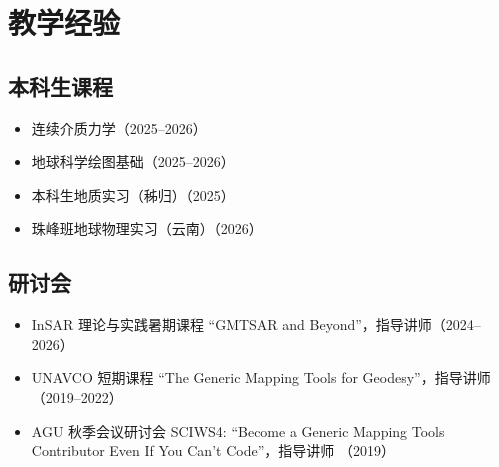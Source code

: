 \section{教学经验}

\subsection{本科生课程}
\begin{itemize}
\item 连续介质力学（2025--2026）
\item 地球科学绘图基础（2025--2026）
\item 本科生地质实习（秭归）（2025）
\item 珠峰班地球物理实习（云南）（2026）
\end{itemize}

\subsection{研讨会}
\begin{itemize}
\item InSAR 理论与实践暑期课程 ``GMTSAR and Beyond''，指导讲师（2024--2026）
\item UNAVCO 短期课程 ``The Generic Mapping Tools for Geodesy''，指导讲师（2019--2022）
\item AGU 秋季会议研讨会 SCIWS4: ``Become a Generic Mapping Tools Contributor Even If You Can't Code''，指导讲师 （2019）
\end{itemize}
